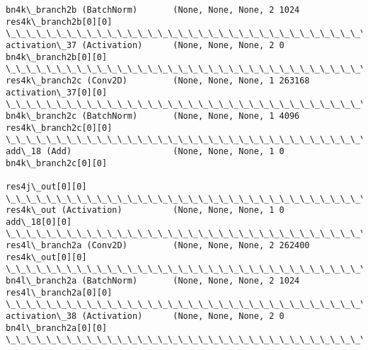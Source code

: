 \documentclass[11pt]{article}
\begin{document}
\begin{Verbatim}[commandchars=\\\{\}]
bn4k\_branch2b (BatchNorm)       (None, None, None, 2 1024        res4k\_branch2b[0][0]             
\_\_\_\_\_\_\_\_\_\_\_\_\_\_\_\_\_\_\_\_\_\_\_\_\_\_\_\_\_\_\_\_\_\_\_\_\_\_\_\_\_\_\_\_\_\_\_\_\_\_\_\_\_\_\_\_\_\_\_\_\_\_\_\_\_\_\_\_\_\_\_\_\_\_\_\_\_\_\_\_\_\_\_\_\_\_\_\_\_\_\_\_\_\_\_\_\_\_
activation\_37 (Activation)      (None, None, None, 2 0           bn4k\_branch2b[0][0]              
\_\_\_\_\_\_\_\_\_\_\_\_\_\_\_\_\_\_\_\_\_\_\_\_\_\_\_\_\_\_\_\_\_\_\_\_\_\_\_\_\_\_\_\_\_\_\_\_\_\_\_\_\_\_\_\_\_\_\_\_\_\_\_\_\_\_\_\_\_\_\_\_\_\_\_\_\_\_\_\_\_\_\_\_\_\_\_\_\_\_\_\_\_\_\_\_\_\_
res4k\_branch2c (Conv2D)         (None, None, None, 1 263168      activation\_37[0][0]              
\_\_\_\_\_\_\_\_\_\_\_\_\_\_\_\_\_\_\_\_\_\_\_\_\_\_\_\_\_\_\_\_\_\_\_\_\_\_\_\_\_\_\_\_\_\_\_\_\_\_\_\_\_\_\_\_\_\_\_\_\_\_\_\_\_\_\_\_\_\_\_\_\_\_\_\_\_\_\_\_\_\_\_\_\_\_\_\_\_\_\_\_\_\_\_\_\_\_
bn4k\_branch2c (BatchNorm)       (None, None, None, 1 4096        res4k\_branch2c[0][0]             
\_\_\_\_\_\_\_\_\_\_\_\_\_\_\_\_\_\_\_\_\_\_\_\_\_\_\_\_\_\_\_\_\_\_\_\_\_\_\_\_\_\_\_\_\_\_\_\_\_\_\_\_\_\_\_\_\_\_\_\_\_\_\_\_\_\_\_\_\_\_\_\_\_\_\_\_\_\_\_\_\_\_\_\_\_\_\_\_\_\_\_\_\_\_\_\_\_\_
add\_18 (Add)                    (None, None, None, 1 0           bn4k\_branch2c[0][0]              
                                                                 res4j\_out[0][0]                  
\_\_\_\_\_\_\_\_\_\_\_\_\_\_\_\_\_\_\_\_\_\_\_\_\_\_\_\_\_\_\_\_\_\_\_\_\_\_\_\_\_\_\_\_\_\_\_\_\_\_\_\_\_\_\_\_\_\_\_\_\_\_\_\_\_\_\_\_\_\_\_\_\_\_\_\_\_\_\_\_\_\_\_\_\_\_\_\_\_\_\_\_\_\_\_\_\_\_
res4k\_out (Activation)          (None, None, None, 1 0           add\_18[0][0]                     
\_\_\_\_\_\_\_\_\_\_\_\_\_\_\_\_\_\_\_\_\_\_\_\_\_\_\_\_\_\_\_\_\_\_\_\_\_\_\_\_\_\_\_\_\_\_\_\_\_\_\_\_\_\_\_\_\_\_\_\_\_\_\_\_\_\_\_\_\_\_\_\_\_\_\_\_\_\_\_\_\_\_\_\_\_\_\_\_\_\_\_\_\_\_\_\_\_\_
res4l\_branch2a (Conv2D)         (None, None, None, 2 262400      res4k\_out[0][0]                  
\_\_\_\_\_\_\_\_\_\_\_\_\_\_\_\_\_\_\_\_\_\_\_\_\_\_\_\_\_\_\_\_\_\_\_\_\_\_\_\_\_\_\_\_\_\_\_\_\_\_\_\_\_\_\_\_\_\_\_\_\_\_\_\_\_\_\_\_\_\_\_\_\_\_\_\_\_\_\_\_\_\_\_\_\_\_\_\_\_\_\_\_\_\_\_\_\_\_
bn4l\_branch2a (BatchNorm)       (None, None, None, 2 1024        res4l\_branch2a[0][0]             
\_\_\_\_\_\_\_\_\_\_\_\_\_\_\_\_\_\_\_\_\_\_\_\_\_\_\_\_\_\_\_\_\_\_\_\_\_\_\_\_\_\_\_\_\_\_\_\_\_\_\_\_\_\_\_\_\_\_\_\_\_\_\_\_\_\_\_\_\_\_\_\_\_\_\_\_\_\_\_\_\_\_\_\_\_\_\_\_\_\_\_\_\_\_\_\_\_\_
activation\_38 (Activation)      (None, None, None, 2 0           bn4l\_branch2a[0][0]              
\_\_\_\_\_\_\_\_\_\_\_\_\_\_\_\_\_\_\_\_\_\_\_\_\_\_\_\_\_\_\_\_\_\_\_\_\_\_\_\_\_\_\_\_\_\_\_\_\_\_\_\_\_\_\_\_\_\_\_\_\_\_\_\_\_\_\_\_\_\_\_\_\_\_\_\_\_\_\_\_\_\_\_\_\_\_\_\_\_\_\_\_\_\_\_\_\_\_

\end{Verbatim}
\end{document}
